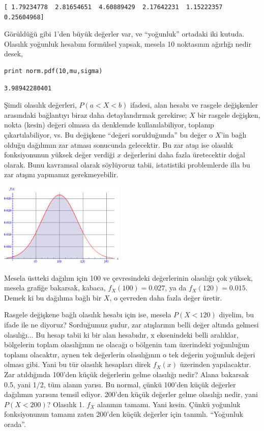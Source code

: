 \documentclass[12pt,fleqn]{article}\usepackage{../../common}
\begin{document}
\begin{verbatim}
[ 1.79234778  2.81654651  4.60889429  2.17642231  1.15222357  0.25604968]
\end{verbatim}

Görüldüğü gibi 1'den büyük değerler var, ve ``yoğunluk'' ortadaki iki
kutuda. Olasılık yoğunluk hesabını formülsel yapsak, mesela 10 noktasının
ağırlığı nedir desek, 

\begin{verbatim}
print norm.pdf(10,mu,sigma)
\end{verbatim}

\begin{verbatim}
3.98942280401
\end{verbatim}

Şimdi olasılık değerleri, $P(a < X < b)$ ifadesi, alan hesabı ve rasgele
değişkenler arasındaki bağlantıyı biraz daha detaylandırmak gerekirse; $X$
bir rasgele değişken, nokta (kesin) değeri olmasa da denklemde
kullanılabiliyor, toplanıp çıkartılabiliyor, vs. Bu değişkene ``değeri
sorulduğunda'' bu değer o $X$'in bağlı olduğu dağılımın zar atması
sonucunda gelecektir. Bu zar atışı ise olasılık fonksiyonunun yüksek değer
verdiği $x$ değerlerini daha fazla üretecektir doğal olarak. Bunu kavramsal
olarak söylüyoruz tabii, istatistiki problemlerde illa bu zar atışını
yapmamız gerekmeyebilir.

\includegraphics[height=4cm]{stat_intro_10.png}

Mesela üstteki dağılım için 100 ve çevresindeki değerlerinin olasılığı çok
yüksek, mesela grafiğe bakarsak, kabaca, $f_X(100) = 0.027$, ya da
$f_X(120) = 0.015$.  Demek ki bu dağılıma bağlı bir $X$, o çevreden daha
fazla değer üretir.

Rasgele değişkene bağlı olasılık hesabı için ise, mesela $P(X < 120)$
diyelim, bu ifade ile ne diyoruz? Sorduğumuz şudur, zar atışlarının belli
değer altında gelmesi olasılığı... Bu hesap tabii ki bir alan hesabıdır, x
eksenindeki belli aralıklar, bölgelerin toplam olasılığının ne olacağı o
bölgenin tam üzerindeki yoğunluğun toplamı olacaktır, aynen tek
değerlerin olasılığının o tek değerin yoğunluk değeri olması gibi. Yani
bu tür olasılık hesapları direk $f_X(x)$ üzerinden yapılacaktır. Zar
atıldığında 100'den küçük değerlerin gelme olasılığı nedir? Alana bakarsak
0.5, yani 1/2, tüm alanın yarısı. Bu normal, çünkü 100'den küçük değerler
dağılımın yarısını temsil ediyor. 200'den küçük değerler gelme olasılığı
nedir, yani $P(X < 200)$? Olasılık 1. $f_X$ alanının tamamı. Yani
kesin. Çünkü yoğunluk fonksiyonunun tamamı zaten 200'den küçük değerler
için tanımlı. ``Yoğunluk orada''.
\end{document}
